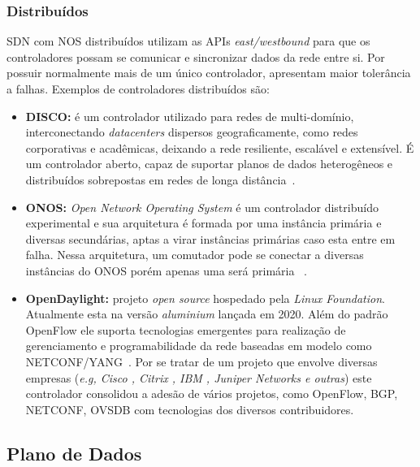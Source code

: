 \subsubsection{Distribuídos}  %
SDN com NOS distribuídos utilizam as APIs \textit{east/westbound} para que os controladores possam se comunicar e sincronizar dados da rede entre si. Por possuir normalmente mais de um único controlador, apresentam maior tolerância a falhas. Exemplos de controladores distribuídos são: 

\begin{itemize}
		\item \textbf{DISCO:} é um controlador utilizado para redes de multi-domínio, interconectando \textit{datacenters} dispersos geograficamente, como redes corporativas e acadêmicas, deixando a rede resiliente, escalável e extensível. É um controlador aberto, capaz de suportar planos de dados heterogêneos e distribuídos sobrepostas em redes de longa distância~\cite{disco2014}. 
        
	\item \textbf{ONOS:} \textit{Open Network Operating System} é um controlador distribuído experimental e sua arquitetura é formada por uma instância primária e diversas secundárias, aptas a virar instâncias primárias caso esta entre em falha. Nessa arquitetura, um comutador pode se conectar a diversas instâncias do ONOS porém apenas uma será primária ~\cite{onos2014}.
    
	\item \textbf{OpenDaylight:} projeto \textit{open source} hospedado pela \textit{Linux Foundation}. Atualmente esta na  versão \textit{aluminium} lançada em 2020. Além do padrão OpenFlow ele suporta tecnologias emergentes para realização de gerenciamento e programabilidade da rede baseadas em modelo como NETCONF/YANG~\cite{opendaylight2014}. Por se tratar de um projeto que envolve diversas empresas (\textit{e.g,  Cisco , Citrix , IBM , Juniper Networks e outras}) este controlador consolidou a adesão de vários projetos, como OpenFlow, BGP, NETCONF, OVSDB com tecnologias dos diversos contribuidores.
\end{itemize}


\subsection{Plano de Dados}

